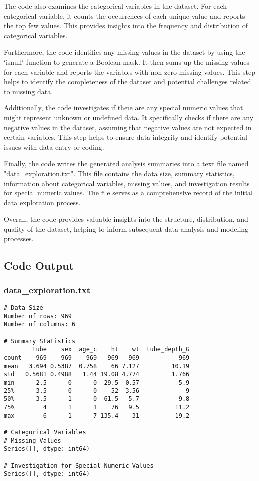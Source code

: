 \documentclass[11pt]{article}
\begin{document}
The code also examines the categorical variables in the dataset. For each categorical variable, it counts the occurrences of each unique value and reports the top few values. This provides insights into the frequency and distribution of categorical variables.

Furthermore, the code identifies any missing values in the dataset by using the `isnull` function to generate a Boolean mask. It then sums up the missing values for each variable and reports the variables with non-zero missing values. This step helps to identify the completeness of the dataset and potential challenges related to missing data.

Additionally, the code investigates if there are any special numeric values that might represent unknown or undefined data. It specifically checks if there are any negative values in the dataset, assuming that negative values are not expected in certain variables. This step helps to ensure data integrity and identify potential issues with data entry or coding.

Finally, the code writes the generated analysis summaries into a text file named "data\_exploration.txt". This file contains the data size, summary statistics, information about categorical variables, missing values, and investigation results for special numeric values. The file serves as a comprehensive record of the initial data exploration process.

Overall, the code provides valuable insights into the structure, distribution, and quality of the dataset, helping to inform subsequent data analysis and modeling processes.

\subsection{Code Output}

\subsubsection*{data\_exploration.txt}

\begin{Verbatim}[tabsize=4]
# Data Size
Number of rows: 969
Number of columns: 6

# Summary Statistics
        tube    sex  age_c    ht    wt  tube_depth_G
count    969    969    969   969   969           969
mean   3.694 0.5387  0.758    66 7.127         10.19
std   0.5681 0.4988   1.44 19.08 4.774         1.766
min      2.5      0      0  29.5  0.57           5.9
25%      3.5      0      0    52  3.56             9
50%      3.5      1      0  61.5   5.7           9.8
75%        4      1      1    76   9.5          11.2
max        6      1      7 135.4    31          19.2

# Categorical Variables
# Missing Values
Series([], dtype: int64)

# Investigation for Special Numeric Values
Series([], dtype: int64)

\end{Verbatim}
\end{document}
